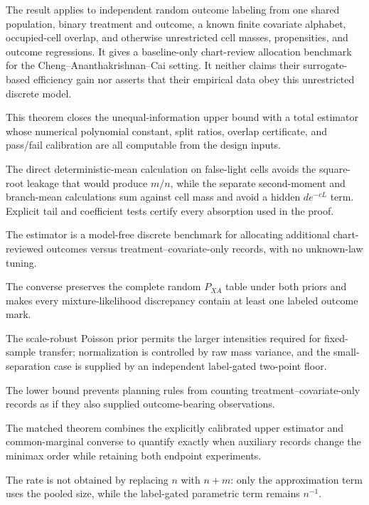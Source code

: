 The result applies to independent random outcome labeling from one shared population, binary treatment and outcome, a known finite covariate alphabet, occupied-cell overlap, and otherwise unrestricted cell masses, propensities, and outcome regressions.  It gives a baseline-only chart-review allocation benchmark for the Cheng--Ananthakrishnan--Cai setting.  It neither claims their surrogate-based efficiency gain nor asserts that their empirical data obey this unrestricted discrete model.

This theorem closes the unequal-information upper bound with a total estimator whose numerical polynomial constant, split ratios, overlap certificate, and pass/fail calibration are all computable from the design inputs.

The direct deterministic-mean calculation on false-light cells avoids the square-root leakage that would produce \(m/n\), while the separate second-moment and branch-mean calculations sum against cell mass and avoid a hidden \(d e^{-cL}\) term.  Explicit tail and coefficient tests certify every absorption used in the proof.

The estimator is a model-free discrete benchmark for allocating additional chart-reviewed outcomes versus treatment--covariate-only records, with no unknown-law tuning.

The converse preserves the complete random \(P_{XA}\) table under both priors and makes every mixture-likelihood discrepancy contain at least one labeled outcome mark.

The scale-robust Poisson prior permits the larger intensities required for fixed-sample transfer; normalization is controlled by raw mass variance, and the small-separation case is supplied by an independent label-gated two-point floor.

The lower bound prevents planning rules from counting treatment--covariate-only records as if they also supplied outcome-bearing observations.

The matched theorem combines the explicitly calibrated upper estimator and common-marginal converse to quantify exactly when auxiliary records change the minimax order while retaining both endpoint experiments.

The rate is not obtained by replacing \(n\) with \(n+m\): only the approximation term uses the pooled size, while the label-gated parametric term remains \(n^{-1}\).

